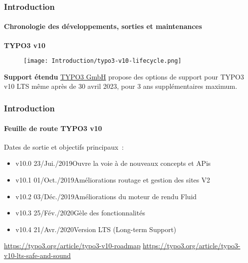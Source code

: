 
\begin{frame}[fragile]
	\frametitle{Introduction}
	\framesubtitle{Chronologie des développements, sorties et maintenances}

	\textbf{TYPO3 v10}

	\begin{figure}
		\texttt{[image: Introduction/typo3-v10-lifecycle.png]}
	\end{figure}

	\textbf{Support étendu}\newline
	\smaller
		\href{https://typo3.com}{TYPO3 GmbH} propose des options de support pour TYPO3
		v10 LTS même après de 30 avril 2023, pour 3 ans supplémentaires maximum.
	\normalsize

\end{frame}


\begin{frame}[fragile]
	\frametitle{Introduction}
	\framesubtitle{Feuille de route TYPO3 v10}

	Dates de sortie et objectifs principaux~:

	\begin{itemize}

		\item v10.0 \tabto{1.1cm}23/Jui./2019\tabto{3.4cm}Ouvre la voie à de nouveaux concepts et APis
		\item v10.1 \tabto{1.1cm}01/Oct./2019\tabto{3.4cm}Améliorations routage et gestion des sites V2
		\item v10.2 \tabto{1.1cm}03/Déc./2019\tabto{3.4cm}Améliorations du moteur de rendu Fluid
		\item v10.3 \tabto{1.1cm}25/Fév./2020\tabto{3.4cm}Gèle des fonctionnalités
		\item
			\begingroup
				\color{typo3orange}
				v10.4 \tabto{1.1cm}21/Avr./2020\tabto{3.4cm}Version LTS (Long-term Support)
			\endgroup

	\end{itemize}

	\vspace{0.6cm}
	\smaller
		\url{https://typo3.org/article/typo3-v10-roadmap}\newline
		\url{https://typo3.org/article/typo3-v10-lts-safe-and-sound}
	\normalsize

\end{frame}

